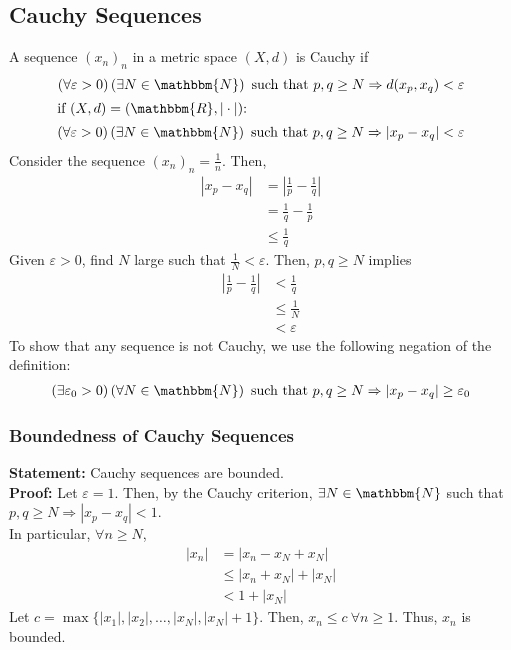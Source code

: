 \documentclass[10pt]{extarticle}
\newcommand{\N}{\mathbbm{N}}
\newcommand{\R}{\mathbbm{R}}
\begin{document}
  \subsection{Cauchy Sequences}%
    A sequence $(x_n)_n$ in a metric space $(X,d)$ is Cauchy if 
    \begin{align*}
      \left(\forall \varepsilon > 0\right)\left(\exists N\in\N\right) \text{ such that } p,q\geq N \Rightarrow d(x_p,x_q) < \varepsilon\\
      \shortintertext{if $(X,d) = (\R,|\cdot|)$:}
      \left(\forall \varepsilon > 0\right)\left(\exists N\in\N\right) \text{ such that } p,q\geq N \Rightarrow |x_p-x_q| < \varepsilon
    \end{align*}
    Consider the sequence $(x_n)_n = \frac{1}{n}$. Then,
    \begin{align*}
      |x_p - x_q| &= \left|\frac{1}{p}-\frac{1}{q}\right|\\
                  &= \frac{1}{q}-\frac{1}{p}\\
                  &\leq \frac{1}{q}
    \end{align*}
    Given $\varepsilon > 0$, find $N$ large such that $\frac{1}{N}< \varepsilon$. Then, $p,q\geq N$ implies
    \begin{align*}
      \left|\frac{1}{p}-\frac{1}{q}\right|& < \frac{1}{q}\\
                                          &\leq \frac{1}{N}\\
                                          &< \varepsilon
    \end{align*}
    To show that any sequence is not Cauchy, we use the following negation of the definition:
    \begin{align*}
      \left(\exists \varepsilon_0 > 0\right)\left(\forall N\in\N\right) \text{ such that } p,q\geq N \Rightarrow |x_p - x_q| \geq \varepsilon_0
    \end{align*}
    \subsubsection{Boundedness of Cauchy Sequences}%
    \textbf{Statement:} Cauchy sequences are bounded.\\

    \textbf{Proof:} Let $\varepsilon = 1$. Then, by the Cauchy criterion, $\exists N\in\N$ such that $p,q\geq N \Rightarrow |x_p-x_q| < 1$.\\

      In particular, $\forall n\geq N$,
      \begin{align*}
        |x_n| &= |x_n - x_N + x_N|\\
              &\leq |x_n + x_N| + |x_N| \tag*{Triangle Inequality}\\
              &< 1 + |x_N|
      \end{align*}
      Let $c = \max\{|x_1|,|x_2|,\dots,|x_N|,|x_N|+1\}$. Then, $x_n \leq c~\forall n\geq 1$. Thus, $x_n$ is bounded.
\end{document}
